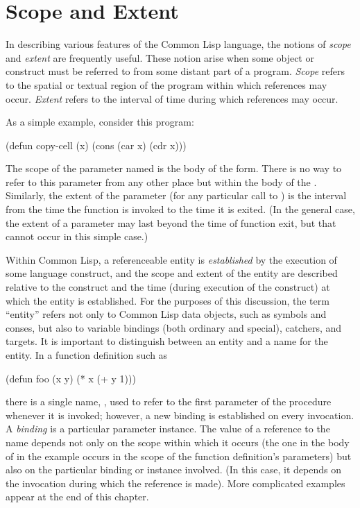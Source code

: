 
\clearpage\def\pagestatus{FINAL PROOF}

\ifx \rulang\Undef

\chapter{Scope and Extent}
\label{SCOPE}

In describing various features of the Common Lisp language, the notions of
\emph{scope} and \emph{extent} are frequently useful.  These notion arise when
some object or construct must be referred to from some distant part of a
program.  \emph{Scope} refers to the spatial or textual region of the
program within which references may occur.  \emph{Extent} refers to the
interval of time during which references may occur.

As a simple example, consider this program:
\begin{lisp}
(defun copy-cell (x) (cons (car x) (cdr x)))
\end{lisp}
The scope of the parameter named  is the body of the  form.
There is no way to refer to this parameter from any other place but within
the body of the .  Similarly, the extent of the parameter 
(for any particular call to ) is the interval from the time
the function is invoked to the time it is exited.  (In the general case,
the extent of a parameter may last beyond the time of function exit,
but that cannot occur in this simple case.)

Within Common Lisp, a referenceable entity is \emph{established} by the execution
of some language construct, and the scope and extent of the entity are
described relative to the construct and the time (during execution of the
construct) at which the entity is established.
For the purposes of this discussion, the term ``entity'' refers not only
to Common Lisp data objects, such as symbols and conses, but also to
variable bindings (both ordinary and special), catchers,
and  targets.  It is important to distinguish between
an entity and a name for the entity.  In a function definition
such as

\begin{lisp}
(defun foo (x y) (* x (+ y 1)))
\end{lisp}

there is a single name, , used to refer to the first parameter
of the procedure whenever it is invoked; however, a new binding
is established on every invocation.  A \emph{binding} is a particular
parameter instance.  The value of a reference to the name 
depends not only on the scope within which it occurs (the one in
the body of  in the example occurs in the scope of the
function definition's parameters) but also on the particular
binding or instance involved.  (In this case, it depends on the
invocation during which
the reference is made).  More complicated examples
appear at the end of this chapter.

